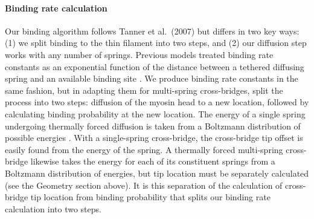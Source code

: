 \documentclass[10pt]{article}
\newcommand{\citep}[1]{\cite{#1}} %
\begin{document}
\paragraph{Binding rate calculation} %
Our binding algorithm follows Tanner et al.~(2007) \citep{Tanner2007} but differs in two key ways: (1) we split binding to the thin filament into two steps, and (2) our diffusion step works with any number of springs.
Previous models treated binding rate constants as an exponential function of the distance between a tethered diffusing spring and an available binding site \citep{Tanner2007, Daniel1998}.
We produce binding rate constants in the same fashion, but in adapting them for multi-spring cross-bridges, split the process into two steps: diffusion of the myosin head to a new location, followed by calculating binding probability at the new location. 
The energy of a single spring undergoing thermally forced diffusion is taken from a Boltzmann distribution of possible energies \citep{BergBook, HowardBook}.
With a single-spring cross-bridge, the cross-bridge tip offset is easily found from the energy of the spring. 
A thermally forced multi-spring cross-bridge likewise takes the energy for each of its constituent springs from a Boltzmann distribution of energies, but tip location must be separately calculated (see the Geometry section above).
It is this separation of the calculation of cross-bridge tip location from binding probability that splits our binding rate calculation into two steps. 
\end{document}
